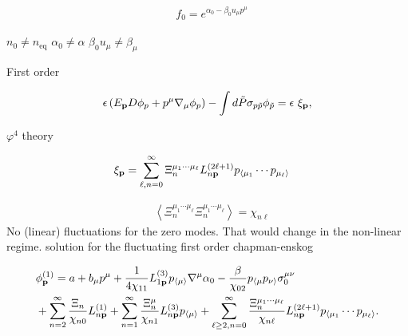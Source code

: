 \documentclass[aps,prd,preprint,nofootinbib,amsmath,amssymb,showpacs,longbibliography,singlecolumn,superscriptaddress,10pt]{revtex4-1}
\theoremstyle{plain}
\theoremstyle{definition}
\begin{document}
\begin{equation}
\begin{aligned}
&
f_{0} = e^{\alpha_{0} - \beta_{0}u_{\mu} p^{\mu}}
\end{aligned}    
\end{equation}

$n_{0} \neq n_{\mathrm{eq}}$ $\alpha_{0} \neq \alpha$ $\beta_{0}u_{\mu} \neq \beta_{\mu}$


First order

\begin{equation}
   \epsilon \left( E_{\bf p} D \phi_p +  p^{\mu} \nabla_{\mu} \phi_p \right) 
   -
\int d \Tilde{P} \sigma_{p \Tilde{p}} \phi_{\Tilde{p}} = \epsilon \ \xi_{\bf p} ,
\end{equation}

$\varphi^{4}$ theory


\begin{equation}
\begin{aligned}
&
\xi_{\bf p} = \sum_{\ell, n = 0}^{\infty} \Xi_{n}^{\mu_{1} \cdots \mu_{\ell}} L^{(2 \ell + 1)}_{n {\bf p}} p_{\langle \mu_{1}} \cdots p_{\mu_{\ell} \rangle}
\end{aligned}    
\end{equation}

\begin{equation}
\begin{aligned}
&
\left\langle \Xi_{n}^{\mu_{1} \cdots \mu_{\ell}} \Xi_{n}^{\mu_{1} \cdots \mu_{\ell}}
\right\rangle
= 
\chi_{n \ell} 
\end{aligned}    
\end{equation}
%
No (linear) fluctuations for the zero modes. That would change in the non-linear regime. solution for the fluctuating first order chapman-enskog

\begin{equation}
\begin{aligned}
&
\phi_{\mathbf{p}}^{(1)} = a + b_\mu p^\mu + \frac{1}{4\chi_{11}}L^{(3)}_{1\mathbf{p}}p_{\langle\mu\rangle}\nabla ^{\mu }\alpha_{0} -\frac{\beta}{\chi_{02}} 
p_{\langle \mu }p_{\nu \rangle}
\sigma^{\mu \nu }_{0}
\\
&
+
\sum_{n = 2}^{\infty} \frac{\Xi_{n}}{\chi_{n 0}} L^{(1)}_{n {\bf p}} 
+
\sum_{n = 1}^{\infty} \frac{\Xi_{n}^{\mu}}{\chi_{n 1}} L^{(3)}_{n {\bf p}} p_{\langle \mu \rangle}
+
\sum_{\ell \geq 2, n = 0}^{\infty} \frac{\Xi_{n}^{\mu_{1} \cdots \mu_{\ell}}}{\chi_{n \ell}} L^{(2 \ell + 1)}_{n {\bf p}} p_{\langle \mu_{1}} \cdots p_{\mu_{\ell} \rangle}
.
\end{aligned}
\end{equation}
\end{document}
